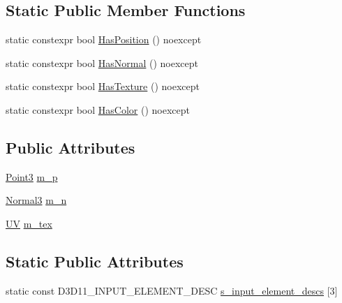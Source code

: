 \subsection*{Static Public Member Functions}
\begin{DoxyCompactItemize}
\item 
static constexpr bool \hyperlink{structmage_1_1rendering_1_1_vertex_position_normal_texture_a5cde27475fae5b650d91ccba4e6a2a8d}{Has\+Position} () noexcept
\item 
static constexpr bool \hyperlink{structmage_1_1rendering_1_1_vertex_position_normal_texture_a5b65b49d120fd660977f8f05b3ee7327}{Has\+Normal} () noexcept
\item 
static constexpr bool \hyperlink{structmage_1_1rendering_1_1_vertex_position_normal_texture_afebe9b59273a84b1ad78f2209d8f500e}{Has\+Texture} () noexcept
\item 
static constexpr bool \hyperlink{structmage_1_1rendering_1_1_vertex_position_normal_texture_abe3243efa83a9d4d28cf56282ba5b793}{Has\+Color} () noexcept
\end{DoxyCompactItemize}
\subsection*{Public Attributes}
\begin{DoxyCompactItemize}
\item 
\hyperlink{structmage_1_1_point3}{Point3} \hyperlink{structmage_1_1rendering_1_1_vertex_position_normal_texture_a6e41b77f1a21c4eb9f49cf936c131aee}{m\+\_\+p}
\item 
\hyperlink{structmage_1_1_normal3}{Normal3} \hyperlink{structmage_1_1rendering_1_1_vertex_position_normal_texture_a7c800b1234a9291361a21ce2289b1394}{m\+\_\+n}
\item 
\hyperlink{structmage_1_1_u_v}{UV} \hyperlink{structmage_1_1rendering_1_1_vertex_position_normal_texture_a8390daa0e3fd706ff42b32a62a935c3c}{m\+\_\+tex}
\end{DoxyCompactItemize}
\subsection*{Static Public Attributes}
\begin{DoxyCompactItemize}
\item 
static const D3\+D11\+\_\+\+I\+N\+P\+U\+T\+\_\+\+E\+L\+E\+M\+E\+N\+T\+\_\+\+D\+E\+SC \hyperlink{structmage_1_1rendering_1_1_vertex_position_normal_texture_a5f3ec0cb5a7957fda248bad573caee44}{s\+\_\+input\+\_\+element\+\_\+descs} \mbox{[}3\mbox{]}
\end{DoxyCompactItemize}


